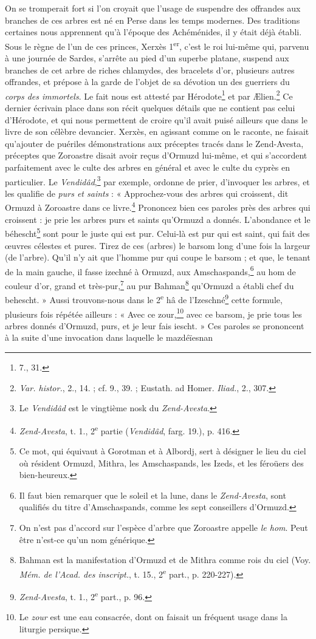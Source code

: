 \documentclass[a4paper, 11pt, oneside, polutonikogreek, french]{article}
\begin{document}
On se tromperait fort si l'on croyait que l'usage de suspendre des offrandes aux branches de ces arbres est né en Perse dans les temps modernes. Des traditions certaines nous apprennent qu'à l'époque des Achéménides, il y était déjà établi. Sous le règne de l'un de ces princes, Xerxès 1\textsuperscript{er}, c'est le roi lui-même qui, parvenu à une journée de Sardes, s'arrête au pied d'un superbe platane, suspend aux branches de cet arbre de riches chlamydes, des bracelets d'or, plusieurs autres offrandes, et prépose à la garde de l'objet de sa dévotion un des guerriers du \emph{corps des immortels}. Le fait nous est attesté par Hérodote\footnote{7., 31.} et par Ælien.\footnote{\emph{Var. histor.}, 2., 14. ; cf. 9., 39. ; Eustath. ad Homer. \emph{Iliad.}, 2., 307.} Ce dernier écrivain place dans son récit quelques détails que ne contient pas celui d'Hérodote, et qui nous permettent de croire qu'il avait puisé ailleurs que dans le livre de son célèbre devancier. Xerxès, en agissant comme on le raconte, ne faisait qu'ajouter de puériles démonstrations aux préceptes tracés dans le Zend-Avesta, préceptes que Zoroastre disait avoir reçus d'Ormuzd lui-même, et qui s'accordent parfaitement avec le culte des arbres en général et avec le culte du cyprès en particulier. Le \emph{Vendidâd},\footnote{Le \emph{Vendidâd} est le vingtième nosk du \emph{Zend-Avesta}.} par exemple, ordonne de prier, d'invoquer les arbres, et les qualifie de \emph{purs et saints} : « Approchez-vous des arbres qui croissent, dit Ormuzd à Zoroastre dans ce livre.\footnote{\emph{Zend-Avesta}, t. 1., 2\textsuperscript{e} partie (\emph{Vendidâd}, farg. 19.), p. 416.} Prononcez bien ces paroles près des arbres qui croissent : je prie les arbres purs et saints qu'Ormuzd a donnés. L'abondance et le béhescht\footnote{Ce mot, qui équivaut à Gorotman et à Albordj, sert à désigner le lieu du ciel où résident Ormuzd, Mithra, les Amschaspands, les Izeds, et les féroüers des bien-heureux.} sont pour le juste qui est pur. Celui-là est pur qui est saint, qui fait des œuvres célestes et pures. Tirez de ces (arbres) le barsom long d'une fois la largeur (de l'arbre). Qu'il n'y ait que l'homme pur qui coupe le barsom ; et que, le tenant de la main gauche, il fasse izechné à Ormuzd, aux Amschaspands,\footnote{Il faut bien remarquer que le soleil et la lune, dans le \emph{Zend-Avesta}, sont qualifiés du titre d'Amschaspands, comme les sept conseillers d'Ormuzd.} au hom de couleur d'or, grand et très-pur,\footnote{On n'est pas d'accord sur l'espèce d'arbre que Zoroastre appelle \emph{le hom}. Peut être n'est-ce qu'un nom générique.} au pur Bahman\footnote{Bahman est la manifestation d'Ormuzd et de Mithra comme rois du ciel (Voy. \emph{Mém. de l'Acad. des inscript.}, t. 15., 2\textsuperscript{e} part., p. 220-227).} qu'Ormuzd a établi chef du behescht. » Aussi trouvons-nous dans le 2\textsuperscript{e} hâ de l'Izeschné\footnote{\emph{Zend-Avesta}, t. 1., 2\textsuperscript{e} part., p. 96.} cette formule, plusieurs fois répétée ailleurs : « Avec ce zour,\footnote{Le \emph{zour} est une eau consacrée, dont on faisait un fréquent usage dans la liturgie persique.} avec ce barsom, je prie tous les arbres donnés d'Ormuzd, purs, et je leur fais iescht. » Ces paroles se prononcent à la suite d'une invocation dans laquelle le mazdéïesnan 
\end{document}
